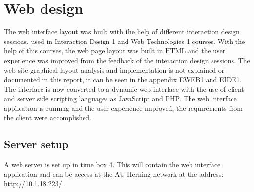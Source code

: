 \chapter{Web design}
The web interface layout was built with the help of different interaction design sessions, used in Interaction Design 1 and Web Technologies 1 courses. With the help of this courses, the web page layout was built in HTML and the user experience was improved from the feedback of the interaction design sessions. The web site graphical layout analysis and implementation is not explained or documented in this report, it can be seen in the appendix EWEB1 and EIDE1.
\p
The interface is now converted to a dynamic web interface with the use of client and server side scripting languages as JavaScript and PHP. The web interface application is running and the user experience improved, the requirements from the client were accomplished.
%
\section{Server setup}
A web server is set up in time box 4. This will contain the web interface application and can be access at the AU-Herning network at the address: http://10.1.18.223/ .

